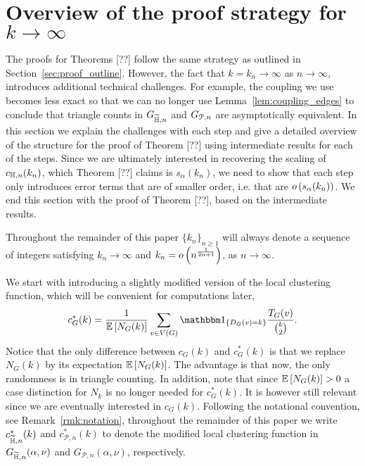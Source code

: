 
\section{Overview of the proof strategy for $k \to \infty$}


The proofs for Theorems [??] follow the same strategy as outlined in Section~\ref{sec:proof_outline}. However, the fact that $k = k_n \to \infty$ as $n \to \infty$, introduces additional technical challenges. For example, the coupling we use becomes less exact so that we can no longer use Lemma~\ref{lem:coupling_edges} to conclude that triangle counts in $G_{\widetilde{\mathbb{H}},n}$ and $G_{{\mathcal P},n}$ are asymptotically equivalent. In this section we explain the challenges with each step and give a detailed overview of the structure for the proof of Theorem [??] using intermediate results for each of the steps. Since we are ultimately interested in recovering the scaling of $c_{\mathbb{H},n}(k_n)$, which Theorem [??] claims is $s_\alpha(k_n)$, we need to show that each step only introduces error terms that are of smaller order, i.e. that are $o\left(s_\alpha(k_n)\right)$. We end this section with the proof of Theorem [??], based on the intermediate results.

\begin{remark}[Diverging $k_n$]
Throughout the remainder of this paper $\{k_n\}_{n \ge 1}$ will always denote a sequence of integers satisfying $k_n \to \infty$ and $k_n = o\left(n^{\frac{1}{2\alpha + 1}}\right)$, as $n \to \infty$.
\end{remark}

We start with introducing a slightly modified version of the local clustering function, which will be convenient for computations later,
\begin{equation}\label{eq:def_local_clustering_ast_general}
	c_{G}^\ast(k) = \frac{1}{\Exp{N_G(k)}} \sum_{v \in V(G)} \ind{D_G(v) = k} \frac{\T_G(v)}{\binom{k}{2}}.
\end{equation}
Notice that the only difference between $c_G(k)$ and $c_G^\ast(k)$ is that we replace $N_G(k)$ by its expectation $\mathbb{E}\left[N_G(k)\right]$. The advantage is that now, the only randomness is in triangle counting. In addition, note that since $\mathbb{E}\left[N_G(k)\right] > 0$ a case distinction for $N_k$ is no longer needed for $c_G^\ast(k)$. It is however still relevant since we are eventually interested in $c_G(k)$. Following the notational convention, see Remark~\ref{rmk:notation}, throughout the remainder of this paper we write $c_{\widetilde{\mathbb{H}},n}^\ast(k)$ and $c_{\mathcal{P},n}^\ast(k)$ to denote the modified local clustering function in $G_{\widetilde{\mathbb{H}},n}(\alpha, \nu)$ and $G_{\mathcal{P},n}(\alpha,\nu)$, respectively.

